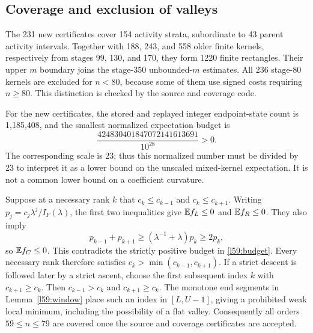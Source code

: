 \subsection{Coverage and exclusion of valleys}
The 231 new certificates cover 154 activity strata, subordinate to 43 parent activity intervals. Together with 188, 243, and 558 older finite kernels, respectively from stages 99, 130, and 170, they form 1220 finite rectangles. Their upper $m$ boundary joins the stage-350 unbounded-$m$ estimates. All 236 stage-80 kernels are excluded for $n<80$, because some of them use signed costs requiring $n\ge80$. This distinction is checked by the source and coverage code.

For the new certificates, the stored and replayed integer endpoint-state count is 1,185,408, and the smallest normalized expectation budget is
\[
 \frac{424830401847072141613691}{10^{28}}>0.
\]
The corresponding scale is 23; thus this normalized number must be divided by 23 to interpret it as a lower bound on the unscaled mixed-kernel expectation. It is not a common lower bound on a coefficient curvature.

Suppose at a necessary rank $k$ that $c_k\le c_{k-1}$ and $c_k\le c_{k+1}$. Writing $p_j=c_j\lambda^j/I_F(\lambda)$, the first two inequalities give $\mathbb E f_L\le0$ and $\mathbb E f_R\le0$. They also imply
\[
 p_{k-1}+p_{k+1}\ge(\lambda^{-1}+\lambda)p_k\ge2p_k,
\]
so $\mathbb E f_C\le0$. This contradicts the strictly positive budget in \eqref{l59:budget}. Every necessary rank therefore satisfies $c_k>\min(c_{k-1},c_{k+1})$. If a strict descent is followed later by a strict ascent, choose the first subsequent index $k$ with $c_{k+1}\ge c_k$. Then $c_{k-1}>c_k$ and $c_{k+1}\ge c_k$. The monotone end segments in Lemma~\ref{l59:window} place such an index in $[L,U-1]$, giving a prohibited weak local minimum, including the possibility of a flat valley. Consequently all orders $59\le n\le79$ are covered once the source and coverage certificates are accepted.

